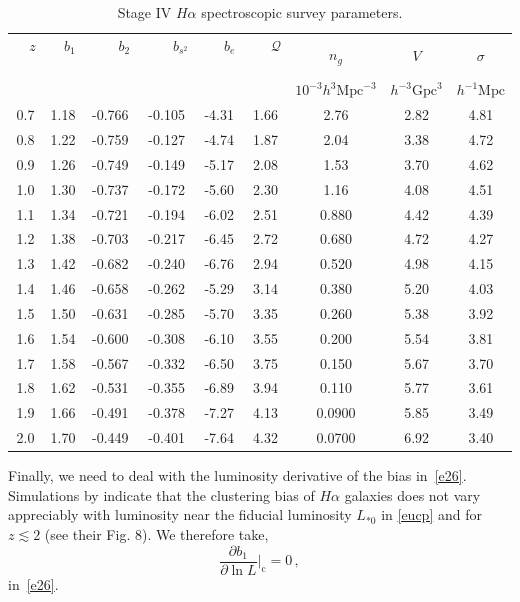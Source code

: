 \begin{table} 
\centering 
\caption{Stage IV $H\alpha$ spectroscopic survey parameters.} \label{tab1} 
\vspace*{0.2cm}
\begin{tabular}{|c|c|c|c|c|c|c|c|c|} 
\hline 
~~$z$~~ & ~~$b_{1}$~~ & ~~~~$b_{2}$~~~~ & ~~~~$b_{s^{2}}$~~~~ & ~~~$b_{e}$~~~ & ~~~$\mathcal{Q}$~~~ & $n_{g}$ & $V$ & $\sigma$ \\ 
 & & & & & & $10^{-3}h^{3} \mathrm{Mpc}^{-3}$ & $h^{-3} \mathrm{Gpc}^{3}$ & $h^{-1} \mathrm{Mpc}$\\
\hline\hline 
0.7 & 1.18 & -0.766 & -0.105 & -4.31 & 1.66 & 2.76 & 2.82 & 4.81 \\
0.8 & 1.22 & -0.759 & -0.127 & -4.74 & 1.87 & 2.04 & 3.38 & 4.72 \\
0.9 & 1.26 & -0.749 & -0.149 & -5.17 & 2.08 & 1.53 & 3.70 & 4.62 \\
1.0 & 1.30 & -0.737 & -0.172 & -5.60 & 2.30 & 1.16 & 4.08 & 4.51 \\
1.1 & 1.34 & -0.721 & -0.194 & -6.02 & 2.51 & 0.880 & 4.42 & 4.39 \\
1.2 & 1.38 & -0.703 & -0.217 & -6.45 & 2.72 & 0.680 & 4.72 & 4.27 \\
1.3 & 1.42 & -0.682 & -0.240 & -6.76 & 2.94 & 0.520 & 4.98 & 4.15 \\
1.4 & 1.46 & -0.658 & -0.262 & -5.29 & 3.14 & 0.380 & 5.20 & 4.03 \\
1.5 & 1.50 & -0.631 & -0.285 & -5.70 & 3.35 & 0.260 & 5.38 & 3.92 \\
1.6 & 1.54 & -0.600 & -0.308 & -6.10 & 3.55 & 0.200 & 5.54 & 3.81 \\
1.7 & 1.58 & -0.567 & -0.332 & -6.50 & 3.75 & 0.150 & 5.67 & 3.70 \\
1.8 & 1.62 & -0.531 & -0.355 & -6.89 & 3.94 & 0.110 & 5.77 & 3.61 \\
1.9 & 1.66 & -0.491 & -0.378 & -7.27 & 4.13 & 0.0900 & 5.85 & 3.49 \\
2.0 & 1.70 & -0.449 & -0.401 & -7.64 & 4.32 & 0.0700 & 6.92 & 3.40 \\ \hline
\end{tabular}
\end{table}
Finally, we need to deal with the luminosity derivative of the bias in~\eqref{e26}. Simulations by \cite{Pan:2019dxa} indicate that the  clustering bias of $H\alpha$ galaxies does not vary appreciably with luminosity near the fiducial luminosity $L_{*0}$ in \eqref{eucp} and for $z\lesssim 2$ (see their Fig. 8). We therefore take,
\begin{equation}\label{b1l}
\frac{\partial b_1}{\partial \ln{L}}\bigg|_{\mathrm{c}}=0\,, 
\end{equation}
in~\eqref{e26}. 



